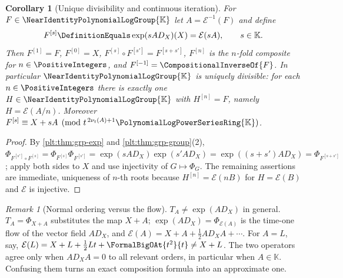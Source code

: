 \documentclass[11pt,oneside]{article}
\theoremstyle{plain}
\newtheorem{corollary}[theorem]{Corollary}
\theoremstyle{definition}
\theoremstyle{remark}
\newtheorem{remark}[theorem]{Remark}
\newcommand{\K}{\mathbb{K}}
\newcommand{\PLpow}{\PolynomialLogPowerSeriesRing{\K}}   %
\newcommand{\Gnear}{\NearIdentityPolynomialLogGroup{\K}} %
\newcommand{\ordt}{\nu_{t}}                              %
\newcommand{\DX}{D_{X}}                                  %
\newcommand{\compose}{\mathbin{\circ}}
\begin{document}
\begin{corollary}[Unique divisibility and continuous iteration]
\label{plt:cor:grp-iteration}
For \(F\in\Gnear\) let \(A=\mathcal E^{-1}(F)\) and define
\[
  F^{[s]}\DefinitionEquals\exp(sA\DX)(X)=\mathcal E(sA),\qquad s\in\K .
\]
Then \(F^{[1]}=F\), \(F^{[0]}=X\),
\(F^{[s]}\compose F^{[s']}=F^{[s+s']}\), \(F^{[n]}\) is the \(n\)-fold
composite for \(n\in\PositiveIntegers\), and
\(F^{[-1]}=\CompositionalInverseOf{F}\).  In particular \(\Gnear\) is uniquely
divisible: for each \(n\in\PositiveIntegers\) there is exactly one
\(H\in\Gnear\) with \(H^{[n]}=F\), namely \(H=\mathcal E(A/n)\).  Moreover
\(F^{[s]}\equiv X+sA\pmod{t^{\,2\ordt(A)+1}\PLpow}\).
\end{corollary}

\begin{proof}
By \cref{plt:thm:grp-exp} and \cref{plt:thm:grp-group}(2),
\(\Phi_{F^{[s']}\compose F^{[s]}}=\Phi_{F^{[s]}}\Phi_{F^{[s']}}
 =\exp(sA\DX)\exp(s'A\DX)=\exp((s+s')A\DX)=\Phi_{F^{[s+s']}}\);
apply both sides to \(X\) and use injectivity of \(G\mapsto\Phi_G\).  The
remaining assertions are immediate, uniqueness of \(n\)-th roots because
\(H^{[n]}=\mathcal E(nB)\) for \(H=\mathcal E(B)\) and \(\mathcal E\) is
injective.
\end{proof}


\begin{remark}[Normal ordering versus the flow]
\label{plt:rmk:grp-normal-ordering}
\(T_A\ne\exp(A\DX)\) in general.  \(T_A=\Phi_{X+A}\) substitutes the map
\(X+A\); \(\exp(A\DX)=\Phi_{\mathcal E(A)}\) is the time-one flow of the
vector field \(A\DX\), and
\(\mathcal E(A)=X+A+\frac12A\DX A+\cdots\).  For \(A=L\), say,
\(\mathcal E(L)=X+L+\frac12Lt+\FormalBigOAt{t^2}{t}\ne X+L\).  The two
operators agree only when \(A\DX A=0\) to all relevant orders, in particular
when \(A\in\K\).  Confusing them turns an exact composition formula into an
approximate one.
\end{remark}
\end{document}
